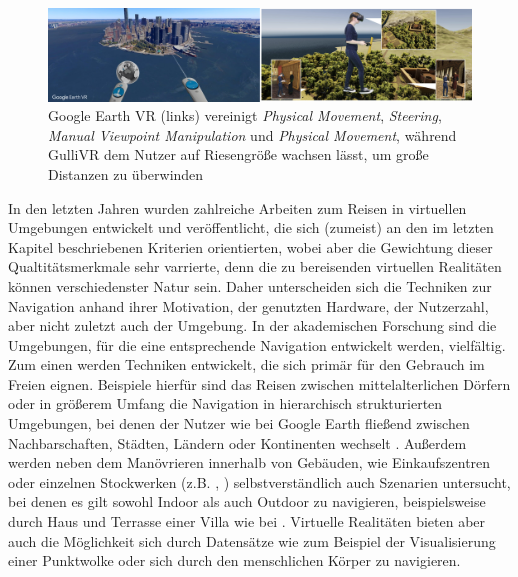 \begin{figure}[h!]
  \centering
  \includegraphics[width=\textwidth]{images/google_gulli.jpg}
  \caption{Google Earth VR (links) vereinigt \textit{Physical Movement}, \textit{Steering}, \textit{Manual Viewpoint Manipulation} und \textit{Physical Movement}, während GulliVR\cite{Krekhov2018GulliVR} dem Nutzer auf Riesengröße wachsen lässt, um große Distanzen zu überwinden}
  \label{fig:todo}
\end{figure}

In den letzten Jahren wurden zahlreiche Arbeiten zum Reisen in virtuellen Umgebungen entwickelt und veröffentlicht, die sich (zumeist) an den im letzten Kapitel beschriebenen Kriterien orientierten, wobei aber die Gewichtung dieser Qualtitätsmerkmale sehr varrierte, denn die zu bereisenden virtuellen Realitäten können verschiedenster Natur sein. Daher unterscheiden sich die Techniken zur Navigation anhand ihrer Motivation, der genutzten Hardware, der Nutzerzahl, aber nicht zuletzt auch der Umgebung.
In der akademischen Forschung sind die Umgebungen, für die eine entsprechende Navigation entwickelt werden, vielfältig.
Zum einen werden Techniken entwickelt, die sich primär für den Gebrauch im Freien eignen. Beispiele hierfür sind das Reisen zwischen mittelalterlichen Dörfern \cite{Krekhov2018GulliVR} oder in größerem Umfang die Navigation in hierarchisch strukturierten Umgebungen, bei denen der Nutzer wie bei Google Earth fließend zwischen Nachbarschaften, Städten, Ländern oder Kontinenten wechselt \cite{pierce_representations}.
Außerdem werden neben dem Manövrieren innerhalb von Gebäuden, wie Einkaufszentren oder einzelnen Stockwerken (z.B. \cite{Richardson1999SpatialEnvironments}, \cite{Liang2018EvaluatingEnvironments}) selbstverständlich auch Szenarien untersucht, bei denen es gilt sowohl Indoor als auch Outdoor zu navigieren, beispielsweise durch Haus und Terrasse einer Villa wie bei \cite{Dallat2018Giant}. 
Virtuelle Realitäten bieten aber auch die Möglichkeit sich durch Datensätze wie zum Beispiel der Visualisierung einer Punktwolke oder sich durch den menschlichen Körper \cite{Kopper2006DesignEnvironments} zu navigieren.

